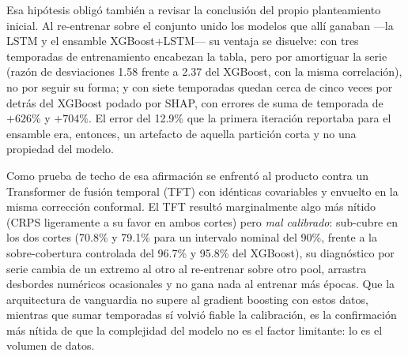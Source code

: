 Esa hipótesis obligó también a revisar la conclusión del propio planteamiento inicial. Al re-entrenar sobre el conjunto unido los modelos que allí ganaban ---la LSTM y el ensamble XGBoost+LSTM--- su ventaja se disuelve: con tres temporadas de entrenamiento encabezan la tabla, pero por amortiguar la serie (razón de desviaciones 1.58 frente a 2.37 del XGBoost, con la misma correlación), no por seguir su forma; y con siete temporadas quedan cerca de cinco veces por detrás del XGBoost podado por SHAP, con errores de suma de temporada de $+626\%$ y $+704\%$. El error del 12.9\% que la primera iteración reportaba para el ensamble era, entonces, un artefacto de aquella partición corta y no una propiedad del modelo.

Como prueba de techo de esa afirmación se enfrentó al producto contra un Transformer de fusión temporal (TFT) con idénticas covariables y envuelto en la misma corrección conformal. El TFT resultó marginalmente algo más nítido (CRPS ligeramente a su favor en ambos cortes) pero \emph{mal calibrado}: sub-cubre en los dos cortes (70.8\% y 79.1\% para un intervalo nominal del 90\%, frente a la sobre-cobertura controlada del 96.7\% y 95.8\% del XGBoost), su diagnóstico por serie cambia de un extremo al otro al re-entrenar sobre otro pool, arrastra desbordes numéricos ocasionales y no gana nada al entrenar más épocas. Que la arquitectura de vanguardia no supere al gradient boosting con estos datos, mientras que sumar temporadas sí volvió fiable la calibración, es la confirmación más nítida de que la complejidad del modelo no es el factor limitante: lo es el volumen de datos.


